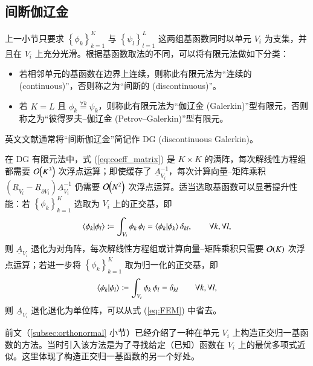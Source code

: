 \subsection{间断伽辽金}

上一小节只要求 $\left\{ \phi_{k}\right\} _{k=1}^{K}$ 与 $\left\{ \psi_{l}\right\} _{l=1}^{L}$
这两组基函数同时以单元 $V_{i}$ 为支集，并且在 $V_{i}$ 上充分光滑。根据基函数取法的不同，可以将有限元法做如下分类：
\begin{itemize}
\item 若相邻单元的基函数在边界上连续，则称此有限元法为“连续的 (continuous)”，否则称之为“间断的 (discontinuous)”。
\item 若 $K=L$ 且 $\phi_{k}\stackrel{\forall k}{=}\psi_{k}$，则称此有限元法为“伽辽金
(Galerkin)”型有限元，否则称之为“彼得罗夫–伽辽金 (Petrov–Galerkin)”型有限元。
\end{itemize}
英文文献通常将“间断伽辽金”简记作 DG
(discontinuous Galerkin)。

在 DG 有限元法中，式 (\ref{eq:coeff_matrix}) 是 $K\times K$ 的满阵，每次解线性方程组都需要
$\order{K^{3}}$ 次浮点运算；即使缓存了 $\underline{A}_{V_{i}}^{-1}$，每次计算向量–矩阵乘积
$\left(\underline{R}_{V_{i}}-\underline{R}_{\partial V_{i}}\right)\underline{A}_{V_{i}}^{-1}$
仍需要 $\order{N^{2}}$ 次浮点运算。适当选取基函数可以显著提升性能：若 $\left\{ \phi_{k}\right\} _{k=1}^{K}$
选取为 $V_{i}$ 上的正交基，即
\begin{equation}
\ip{\phi_{k}}{\phi_{l}}\coloneqq\int_{V_{i}}\phi_{k}\,\phi_{l}=\ip{\phi_{k}}{\phi_{k}}\delta_{kl},\qquad\forall k,\forall l,
\end{equation}
则 $\underline{A}_{V_{i}}$ 退化为对角阵，每次解线性方程组或计算向量–矩阵乘积只需要 $\order{K}$
次浮点运算；若进一步将 $\left\{ \phi_{k}\right\} _{k=1}^{K}$ 取为归一化的正交基，即
\begin{equation}
\ip{\phi_{k}}{\phi_{l}}\coloneqq\int_{V_{i}}\phi_{k}\,\phi_{l}=\delta_{kl}\qquad\forall k,\forall l,
\end{equation}
则 $\underline{A}_{V_{i}}$ 退化退化为单位阵，可以从式 (\ref{eq:FEM}) 中省去。

前文（\ref{subsec:orthonormal} 小节）已经介绍了一种在单元 $V_{i}$ 上构造正交归一基函数的方法。当时引入该方法是为了寻找给定（已知）函数在
$V_{i}$ 上的最优多项式近似。这里体现了构造正交归一基函数的另一个好处。


